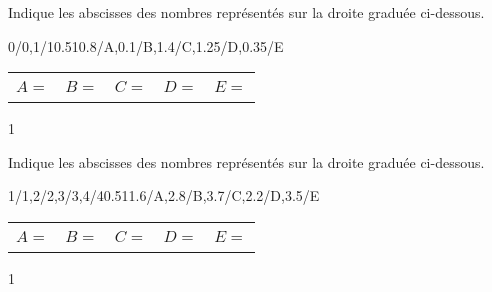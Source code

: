 \documentclass[a4paper,11pt]{report}
\begin{document}
\begin{exop}{
Indique les abscisses des nombres représentés sur la droite graduée ci-dessous.
\vspace{-0.2cm}
\begin{center}
	\begin{numberlined}{0}{1.6}{1}{0.1}{0/0,1/1}{0.5}{1}{0.8/A,0.1/B,1.4/C,1.25/D,0.35/E}
\end{numberlined}
\end{center}
\begin{center}
\begin{tabular}{|p{2.5cm}|p{2.5cm}|p{2.5cm}|p{2.5cm}|p{2.5cm}|}\hline
& & & & \\
$A=$&$B=$&$C=$&$D=$&$E=$ \\
& & & & \\\hline
\end{tabular}
\end{center}
\vspace{-0.5cm}
}{1}\end{exop}


\begin{exop}{
Indique les abscisses des nombres représentés sur la droite graduée ci-dessous.
\vspace{-0.2cm}
\begin{center}
	\begin{numberlined}{1}{4}{1}{0.2}{1/1,2/2,3/3,4/4}{0.5}{1}{1.6/A,2.8/B,3.7/C,2.2/D,3.5/E}
\end{numberlined}
\begin{tabular}{|p{2.5cm}|p{2.5cm}|p{2.5cm}|p{2.5cm}|p{2.5cm}|}\hline
& & & & \\
$A=$&$B=$&$C=$&$D=$&$E=$ \\
& & & & \\\hline
\end{tabular}
\end{center}
\vspace{-0.5cm}
}{1}\end{exop}
\end{document}
